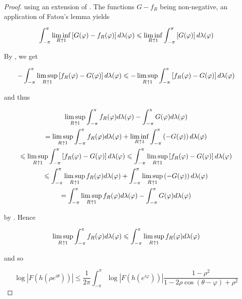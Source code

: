 \begin{proof}
using an extension of \cite[359]{bourbaki:general_topology:1995}. The functions $G - f_R$ being non-negative, an application of Fatou's lemma yields

\begin{equation*}
	\int_{-\pi}^\pi \liminf_{R \toup 1}\left[ G(\varphi) - f_R(\varphi)\right]d\lambda(\varphi) \leqslant \liminf_{R \toup 1} \int_{-\pi}^\pi \left[ G(\varphi)\right]d\lambda(\varphi)
\end{equation*}

By \cite[354]{bourbaki:general_topology:1995}, we get

\begin{equation*}
	-\int_{-\pi}^\pi \limsup_{R \toup 1}\left[ f_R(\varphi) - G(\varphi)\right]d\lambda(\varphi) \leqslant -\limsup_{R \toup 1} \int_{-\pi}^\pi \left[ f_R(\varphi) - G(\varphi)\right]d\lambda(\varphi)
\end{equation*}

and thus

\begin{multline*}
	\limsup_{R \toup 1} \int_{-\pi}^\pi f_R(\varphi) d\lambda(\varphi) - \int_{-\pi}^\pi G(\varphi)d\lambda(\varphi)\\
	= \limsup_{R \toup 1} \int_{-\pi}^\pi f_R(\varphi) d\lambda(\varphi) + \liminf_{R \toup 1}\int_{-\pi}^\pi \left(-G(\varphi)\right)d\lambda(\varphi)\\
	\leqslant \limsup_{R \toup 1}\int_{-\pi}^\pi \left[ f_R(\varphi) - G(\varphi)\right]d\lambda(\varphi)\leqslant \int_{-\pi}^\pi \limsup_{R \toup 1} \left[f_R(\varphi) - G(\varphi)\right]d\lambda(\varphi)\\
	\leqslant \int_{-\pi}^\pi \limsup_{R \toup 1} f_R(\varphi) d\lambda(\varphi) + \int_{-\pi}^\pi\limsup_{R \toup 1} \left(-G(\varphi)\right)d\lambda(\varphi)\\
	= \int_{-\pi}^\pi \limsup_{R \toup 1}f_R(\varphi) d\lambda(\varphi) - \int_{-\pi}^\pi G(\varphi)d\lambda(\varphi)
\end{multline*}

by \cite[358]{bourbaki:general_topology:1995}. Hence

\begin{equation*}
	\limsup_{R \toup 1} \int_{-\pi}^\pi f_R(\varphi) d\lambda(\varphi) \leqslant\int_{-\pi}^\pi \limsup_{R \toup 1}f_R(\varphi) d\lambda(\varphi)
\end{equation*}

and so 

\begin{equation}
	\log\left| F( h( \rho e^{i\theta} ) )\right| \leqslant \frac{1}{2\pi} \int_{-\pi}^\pi \log\left| F( h( e^{i\varphi}))\right| \frac{1 - \rho^2}{1 - 2\rho\cos\left( \theta - \varphi \right) + \rho^2}	
	\label{eq:limit_case}
\end{equation}


\end{proof}
